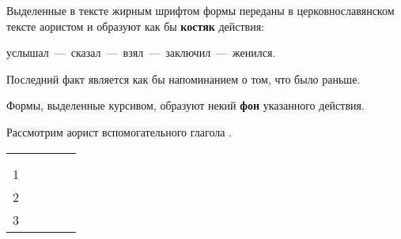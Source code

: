 \documentclass[11pt,a4paper,oneside]{memoir}
\newcommand{\spheading}[2][10em]{%
    \rotatebox{90}{\parbox{#1}{\raggedright #2}}}
\begin{document}
    Выделенные в тексте жирным шрифтом формы переданы в церковнославянском тексте аористом и образуют как бы \textbf{костяк} действия:

    \begin{center}
        услышал~---~сказал~---~взял~---~заключил~---~женился.
    \end{center}

    Последний факт является как бы напоминанием о том, что было раньше.
    
    Формы, выделенные курсивом, образуют некий \textbf{фон} указанного действия.
    
    Рассмотрим аорист вспомогательного глагола {}.


    \begin{center}
        \renewcommand*{\arraystretch}{1.2}
        \begin{tabular}[c]{|c|c|c|c|c|}
            \hline
            
            \multirow{2}{*}{\spheading[2em]{\scriptsize{Лицо}}}
            & 
            & 
            & 
            \\
            
            
            &
            & \scriptsize{}
            & \scriptsize{}
            &
            \\
            
            \hline
            
            1
            & 
            & 
            & 
            & 
            \\\hline
            
            2
            & 
            & 
            & 
            & 
            \\\hline
            
            3
            & 
            & 
            & 
            & 
            \\\hline
            
        \end{tabular}
    \end{center}
\end{document}

